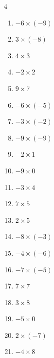 \begin{multicols}{4}
\begin{enumerate}
  \item $-6\times (-9)$
        \phantom{$=54$}

  \item $3\times (-8)$
        \phantom{$=-24$}

  \item $4\times 3$
        \phantom{$=12$}

  \item $-2\times 2$
        \phantom{$=-4$}

  \item $9\times 7$
        \phantom{$=63$}

  \item $-6\times (-5)$
        \phantom{$=30$}

  \item $-3\times (-2)$
        \phantom{$=6$}

  \item $-9\times (-9)$
        \phantom{$=81$}

  \item $-2\times 1$
        \phantom{$=-2$}

  \item $-9\times 0$
        \phantom{$=0$}

  \item $-3\times 4$
        \phantom{$=-12$}

  \item $7\times 5$
        \phantom{$=35$}

  \item $2\times 5$
        \phantom{$=10$}

  \item $-8\times (-3)$
        \phantom{$=24$}

  \item $-4\times (-6)$
        \phantom{$=24$}

  \item $-7\times (-5)$
        \phantom{$=35$}

  \item $7\times 7$
        \phantom{$=49$}

  \item $3\times 8$
        \phantom{$=24$}

  \item $-5\times 0$
        \phantom{$=0$}

  \item $2\times (-7)$
        \phantom{$=-14$}

  \item $-4\times 8$
        \phantom{$=-32$}


\end{enumerate}
\end{multicols}
